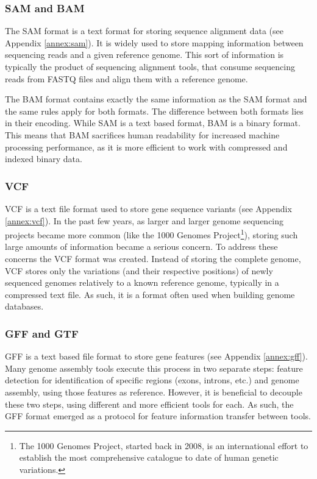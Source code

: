 \subsubsection*{SAM and BAM}

The SAM format is a text format for storing sequence alignment data
\cite{genome:sam} (see Appendix \ref{annex:sam}). It is widely used to store
mapping information between sequencing reads and a given reference genome. This
sort of information is typically the product of sequencing alignment tools, that
consume sequencing reads from FASTQ files and align them with a reference
genome.

The BAM format contains exactly the same information as the SAM format and the
same rules apply for both formats. The difference between both formats lies in
their encoding. While SAM is a text based format, BAM is a binary format. This
means that BAM sacrifices human readability for increased machine processing
performance, as it is more efficient to work with compressed and indexed binary
data.

\subsubsection*{VCF}

VCF is a text file format used to store gene sequence variants \cite{smith13}
(see Appendix \ref{annex:vcf}). In the past few years, as larger and larger
genome sequencing projects became more common (like the 1000 Genomes
Project\footnote{The 1000 Genomes Project, started back in 2008, is an
international effort to establish the most comprehensive catalogue to date of
human genetic variations.}), storing such large amounts of information became a
serious concern. To address these concerns the VCF format was created. Instead
of storing the complete genome, VCF stores only the variations (and their
respective positions) of newly sequenced genomes relatively to a known reference
genome, typically in a compressed text file. As such, it is a format often used
when building genome databases.

\subsubsection*{GFF and GTF}

GFF is a text based file format to store gene features \cite{sanger11} (see
Appendix \ref{annex:gff}). Many genome assembly tools execute this process in
two separate steps: feature detection for identification of specific regions
(exons, introns, etc.) and genome assembly, using those features as reference.
However, it is beneficial to decouple these two steps, using different and more
efficient tools for each. As such, the GFF format emerged as a protocol for
feature information transfer between tools.

